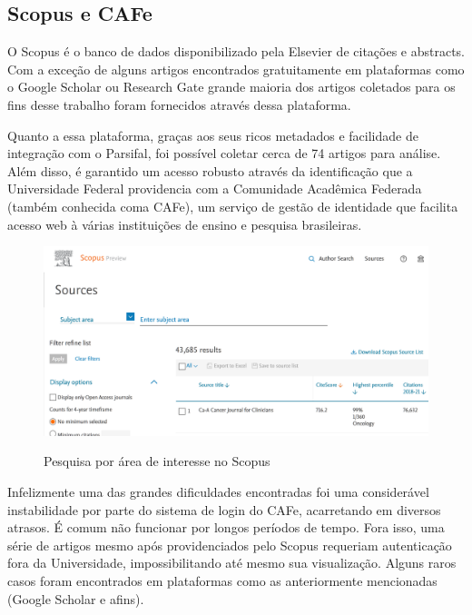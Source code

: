 \subsection{Scopus e CAFe}
O Scopus é o banco de dados disponibilizado pela Elsevier de citações e abstracts. Com a exceção de alguns artigos encontrados gratuitamente em plataformas como o Google Scholar ou Research Gate grande maioria dos artigos coletados para os fins desse trabalho foram fornecidos através dessa plataforma.

Quanto a essa plataforma, graças aos seus ricos metadados e facilidade de integração com o Parsifal, foi possível coletar cerca de 74 artigos para análise. Além disso, é garantido um acesso robusto através da identificação que a Universidade Federal providencia com a Comunidade Acadêmica Federada (também conhecida coma CAFe), um serviço de gestão de identidade que facilita acesso web à várias instituições de ensino e pesquisa brasileiras. 

\begin{figure}[ht]
    \centering
    \caption{Pesquisa por área de interesse no Scopus}
    \includegraphics[width=14cm]{figuras/scopus.png} 
    \label{fig:internet} 
\end{figure}

\bigskip

Infelizmente uma das grandes dificuldades encontradas foi uma considerável instabilidade por parte do sistema de login do CAFe, acarretando em diversos atrasos. É comum não funcionar por longos períodos de tempo. Fora isso, uma série de artigos mesmo após providenciados pelo Scopus requeriam autenticação fora da Universidade, impossibilitando até mesmo sua visualização. Alguns raros casos foram encontrados em plataformas como as anteriormente mencionadas (Google Scholar e afins).

